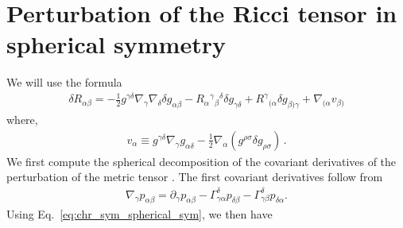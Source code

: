 \documentclass[12pt]{report}
\begin{document}
\section{Perturbation of the Ricci tensor in spherical symmetry}

We will use the formula 
\begin{align}
    \delta R_{\alpha\beta}
    =
    -
    \frac{1}{2}g^{\gamma\delta}
    \nabla_{\gamma}\nabla_{\delta}\delta g_{\alpha\beta}
    -
    R_{\alpha}{}^{\gamma}{}_{\beta}{}^{\delta}\delta g_{\gamma\delta}
    +
    R^{\gamma}{}_{(\alpha}\delta g_{\beta)\gamma}
    +
    \nabla_{(\alpha}v_{\beta)} 
\end{align}
where,
\begin{align}
    v_{\alpha} \equiv g^{\gamma \delta} \nabla_{\gamma} g_{\alpha \delta} - \frac{1}{2} \nabla_{\alpha} \left( g^{\rho \sigma}\delta g_{\rho \sigma}\right)\,.
\end{align}
We first compute the spherical decomposition of the covariant derivatives 
of the  perturbation of the metric tensor \cite{Martel:2003ab}. 
The first covariant derivatives follow from
\begin{align}
    \nabla_{\gamma}p_{\alpha\beta}
    =
    \partial_{\gamma}p_{\alpha\beta}
    -
    \Gamma^{\delta}_{\gamma\alpha}p_{\delta\beta}
    -
    \Gamma^{\delta}_{\gamma\beta}p_{\delta\alpha}
    .
\end{align}
Using Eq.~\eqref{eq:chr_sym_spherical_sym}, we then have
\end{document}
